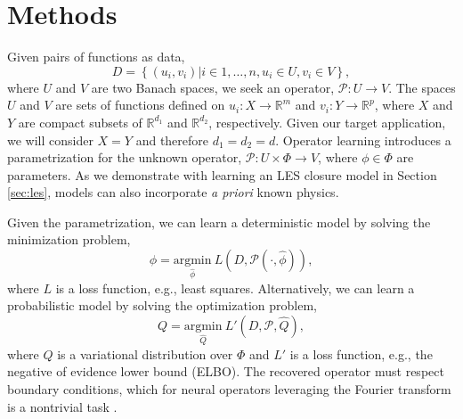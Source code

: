 \section{Methods}\label{methods}

Given pairs of functions as data, 
\begin{equation*}
    D = \left\{(u_i,v_i) | i\in {1,\hdots,n}, u_i \in U, v_i \in V\right\},
\end{equation*} 
where $U$ and $V$ are two Banach spaces, we seek an operator, $\mathcal{P}: U \rightarrow V$. The spaces $U$ and $V$ are sets of functions defined on $u_i: X \rightarrow \mathbb{R}^m$ and $v_i: Y\rightarrow \mathbb{R}^p$, where $X$ and $Y$ are compact subsets of $\mathbb{R}^{d_1}$ and $\mathbb{R}^{d_2}$, respectively.  Given our target application, we will consider $X=Y$ and therefore $d_1=d_2=d$. Operator learning introduces a parametrization for the unknown operator, $\mathcal{P}:U\times \Phi \rightarrow V$, where $\phi \in \Phi$ are parameters. As we demonstrate with learning an LES closure model in Section \ref{sec:les}, models can also incorporate \textit{a priori} known physics.

Given the parametrization, we can learn a deterministic model by solving the minimization problem,
\begin{equation} \label{eq:opt1}
    \phi = \underset{\hat\phi}{\mathrm{argmin}}\ L(D, \mathcal{P} (\cdot,\hat \phi)),
\end{equation}
where $L$ is a loss function, e.g., least squares. 
Alternatively, we can learn a probabilistic model by solving the optimization problem,
\begin{equation} \label{eq:opt2}
    Q = \underset{\hat Q}{\mathrm{argmin}}\ L'(D, \mathcal{P},\hat{Q}),
\end{equation}
where $Q$ is a variational distribution over $\Phi$ and $L'$ is a loss function, e.g., the negative of evidence lower bound (ELBO). 
The recovered operator must respect boundary conditions, which for neural operators leveraging the Fourier transform is a nontrivial task \cite{Li2023deform}.


